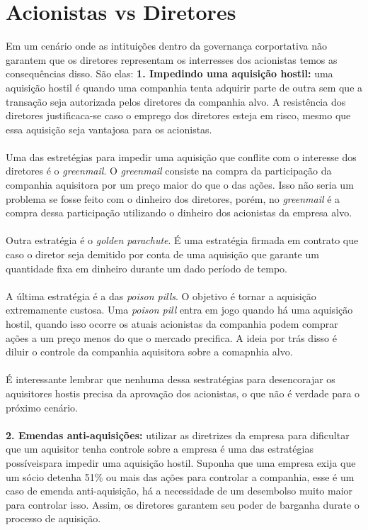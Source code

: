 \section{Acionistas vs Diretores}
Em um cenário onde as intituições dentro da governança corportativa não garantem que os diretores representam os interresses dos acionistas temos as consequências disso. São elas:
\textbf{1. Impedindo uma aquisição hostil:} uma aquisição hostil é quando uma companhia tenta adquirir parte de outra sem que a transação seja autorizada pelos diretores da companhia alvo. A resistência dos diretores justificaca-se caso o emprego dos diretores esteja em risco, mesmo que essa aquisição seja vantajosa para os acionistas.
\\~\\
Uma das estretégias para impedir uma aquisição que conflite com o interesse dos diretores é o \textit{greenmail}. O \textit{greenmail} consiste na compra da participação da companhia aquisitora por um preço maior do que o das ações. Isso não seria um problema se fosse feito com o dinheiro dos diretores, porém, no \textit{greenmail} é a compra dessa participação utilizando o dinheiro dos acionistas da empresa alvo.
\\~\\
Outra estratégia é o \textit{golden parachute}. É uma estratégia firmada em contrato que caso o diretor seja demitido por conta de uma aquisição que garante um quantidade fixa em dinheiro durante um dado período de tempo.
\\~\\
A última estratégia é a das \textit{poison pills}. O objetivo é tornar a aquisição extremamente custosa. Uma \textit{poison pill} entra em jogo quando há uma aquisição hostil, quando isso ocorre os atuais acionistas da companhia podem comprar ações a um preço menos do que o mercado precifica. A ideia por trás disso é diluir o controle da companhia aquisitora sobre a comapnhia alvo.
\\~\\
É interessante lembrar que nenhuma dessa sestratégias para desencorajar os aquisitores hostis precisa da aprovação dos acionistas, o que não é verdade para o próximo cenário.
\\~\\
\textbf{2. Emendas anti-aquisições:} utilizar as diretrizes da empresa para dificultar que um aquisitor tenha controle sobre a empresa é  uma das estratégias possíveispara impedir uma aquisição hostil. Suponha que uma empresa exija que um sócio detenha 51\% ou mais das ações para controlar a companhia, esse é um caso de emenda anti-aquisição, há a necessidade de um desembolso muito maior para controlar isso. Assim, os diretores garantem seu poder de barganha durate o processo de aquisição.
